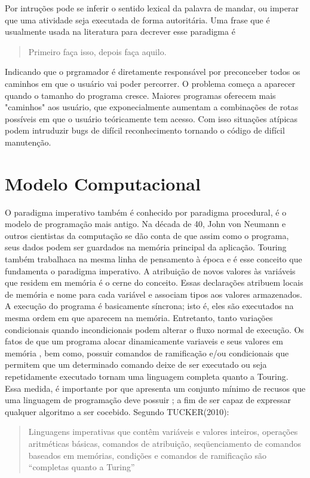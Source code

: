 \documentclass[11pt]{article}
\begin{document}
Por intruções pode se inferir o sentido lexical da palavra de mandar, ou imperar que uma atividade seja executada de forma autoritária. Uma frase que é usualmente  usada na literatura para decrever esse paradigma é

\begin{quote}
Primeiro faça isso, depois faça aquilo.
\end{quote}

Indicando que o prgramador é diretamente responsável por preconceber todos os caminhos em que o usuário vai poder percorrer. O problema começa a aparecer quando o tamanho do programa cresce. Maiores programas oferecem mais "caminhos" aos usuário, que exponecialmente aumentam a combinações de rotas possíveis em que o usuário teóricamente tem acesso. Com isso situações atípicas podem intruduzir bugs de difícil reconhecimento tornando o código de difícil manutenção.

\section{Modelo Computacional}
\label{sec:org2b9f14e}

O paradigma imperativo também é conhecido por paradigma procedural, é o modelo de programação mais antigo. Na década de 40, John von Neumann e outros cientistas da computação se dão conta de que assim como o programa, seus dados podem ser guardados na memória principal da aplicação. Touring também trabalhaca na mesma linha de pensamento à época e é esse conceito que fundamenta o paradigma imperativo. A atribuição de novos valores às variáveis que residem em memória é o cerne do conceito.
Essas declarações atribuem locais de memória e nome para cada variável e associam tipos aos valores armazenados. A execução do programa é basicamente síncrona; isto é, eles são executados na mesma ordem em que aparecem na memória. Entretanto, tanto variações condicionais quando incondicionais podem alterar o fluxo normal de execução. Os fatos de que um programa alocar dinamicamente variaveis e seus valores em memória , bem como, possuir comandos de ramificação e/ou condicionais que permitem que um determinado comando deixe de ser executado ou seja repetidamente executado tornam uma linguagem completa quanto a Touring.
Essa medida, é importante por que apresenta um conjunto mínimo de recusos que uma linguagem de programação deve possuir ; a fim de ser capaz de expressar qualquer algoritmo a ser cocebido. Segundo TUCKER(2010):
\begin{quote}
Linguagens imperativas que contêm variáveis e valores inteiros, operações aritméticas básicas, comandos de atribuição, seqüenciamento de comandos baseados em memórias, condições e comandos de ramificação são “completas quanto a Turing”
\end{quote}
\end{document}

